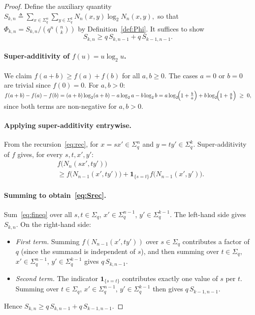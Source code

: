 \documentclass[conference]{IEEEtran}
\begin{document}
\begin{proof}
Define the auxiliary quantity
\(
  S_{k,n}\triangleq\sum_{x\in\Sigma_q^n}\sum_{y\in\Sigma_q^k}
  N_n(x,y)\log_2 N_n(x,y),
\)
so that $\Phi_{k,n}=S_{k,n}/(q^n\binom{n}{k})$ by
Definition~\ref{def:Phi}.  It suffices to show
\begin{equation}
  S_{k,n}\ge q\,S_{k,n-1}+q\,S_{k-1,n-1}.
  \label{eq:Srec}
\end{equation}

\paragraph{Super-additivity of $f(u)=u\log_2 u$.}
We claim $f(a+b)\ge f(a)+f(b)$ for all $a,b\ge 0$.  The cases
$a=0$ or $b=0$ are trivial since $f(0)=0$.  For $a,b>0$:
\(
  f(a+b)-f(a)-f(b)
  =(a+b)\log_2(a+b)-a\log_2 a-b\log_2 b
  =a\log_2\!\Bigl(1+\frac{b}{a}\Bigr)
   +b\log_2\!\Bigl(1+\frac{a}{b}\Bigr)\;\ge\;0,
\)
since both terms are non-negative for $a,b>0$.

\paragraph{Applying super-additivity entrywise.}
From the recursion~\eqref{eq:rec},
for $x=sx'\in\Sigma_q^n$ and $y=ty'\in\Sigma_q^k$.
Super-additivity of $f$ gives, for every $s,t,x',y'$:
\begin{align}
  &f\bigl(N_n(sx',ty')\bigr) \nonumber\\
  &\ge f\bigl(N_{n-1}(x',ty')\bigr)
   +\mathbf{1}_{\{s=t\}}f\bigl(N_{n-1}(x',y')\bigr).
  \label{eq:fineq}
\end{align}

\paragraph{Summing to obtain~\eqref{eq:Srec}.}
Sum~\eqref{eq:fineq} over all $s,t\in\Sigma_q$,
$x'\in\Sigma_q^{n-1}$, $y'\in\Sigma_q^{k-1}$.  The left-hand side
gives $S_{k,n}$.  On the right-hand side:
\begin{itemize}
  \item \emph{First term.} Summing $f(N_{n-1}(x',ty'))$ over
        $s\in\Sigma_q$ contributes a factor of $q$ (since the summand
        is independent of $s$), and then summing over $t\in\Sigma_q$,
        $x'\in\Sigma_q^{n-1}$, $y'\in\Sigma_q^{k-1}$ gives
        $q\,S_{k,n-1}$.
  \item \emph{Second term.} The indicator $\mathbf{1}_{\{s=t\}}$
        contributes exactly one value of $s$ per $t$.  Summing over
        $t\in\Sigma_q$, $x'\in\Sigma_q^{n-1}$, $y'\in\Sigma_q^{k-1}$
        then gives $q\,S_{k-1,n-1}$.
\end{itemize}
Hence $S_{k,n}\ge q\,S_{k,n-1}+q\,S_{k-1,n-1}$.


\end{proof}
\end{document}
